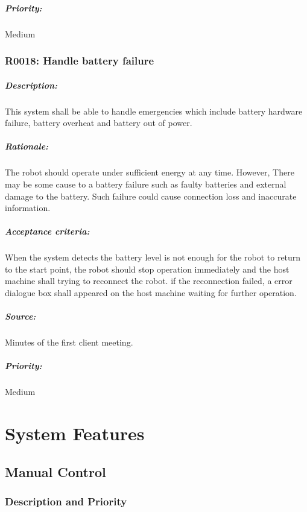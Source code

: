 \documentclass[11pt, a4paper]{report}
\begin{document}
\paragraph{Priority:}
Medium


\subsection{R0018: Handle battery failure}
\paragraph{Description:}
This system shall be able to handle emergencies which include battery hardware failure, battery overheat and battery out of power.
\paragraph{Rationale:}
The robot should operate under sufficient energy at any time. However, There may be some cause to a battery failure such as faulty batteries and external damage to the battery. Such failure could cause connection loss and inaccurate information. 
\paragraph{Acceptance criteria:}
When the system detects the battery level is not enough for the robot to return to the start point, the robot should stop operation immediately and the host machine shall trying to reconnect the robot. if the reconnection failed, a error dialogue box shall appeared on the host machine waiting for further operation.
\paragraph{Source:}
Minutes of the first client meeting.
\paragraph{Priority:}
Medium

		
		   

\pagebreak
\chapter {System Features}
\section {Manual Control}
\subsection {Description and Priority}
\end{document}
